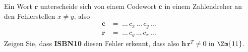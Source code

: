 \begin{aufgabe}
Ein Wort $\mathbf{r}$ unterscheide sich von einem Codewort $\mathbf{c}$ in einem Zahlendreher an
den Fehlerstellen $x \neq y$, also
\begin{align*}
\mathbf{c} &= \;\dots\, c_x \,\dots\, c_y \,\dots\\
\mathbf{r} &= \;\dots\, c_y \,\dots\, c_x \,\dots
\end{align*}
Zeigen Sie, dass \textbf{ISBN10} diesen Fehler erkennt, dass also $\mathbf{h}\,\mathbf{r}^T \neq 0$ in $\Zm{11}$.
\end{aufgabe}
